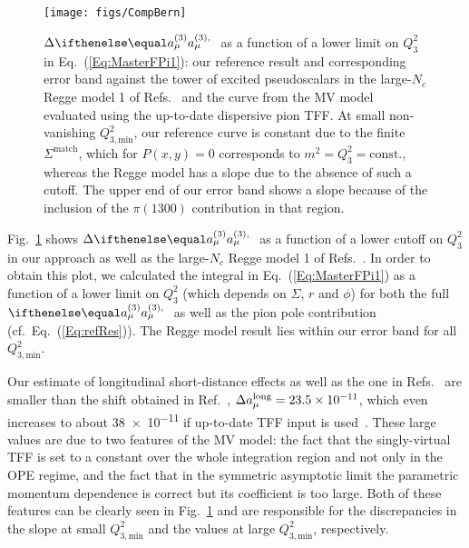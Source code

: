 \begin{figure*}
    \centering
    \texttt{[image: figs/CompBern]}
    \caption{$\Delta \aPion$ as a function of a lower limit on $Q_3^2$ in Eq.~(\ref{Eq:MasterFPi1}): our reference result and corresponding error band against the tower of excited pseudoscalars in the large-$N_c$ Regge model 1 of Refs.~\cite{BernSDCShort,BernSDCLong} and the curve from the MV model~\cite{MV} evaluated using the up-to-date dispersive pion TFF. At small non-vanishing $Q_{3,\text{min}}^2$, our reference curve is constant due to the finite $\Sigma^\text{match}$, which for $P(x,y)=0$ corresponds to $m^2 = Q_3^2 = \text{const.}$, whereas the Regge model has a slope due to the absence of such a cutoff. The upper end of our error band shows a slope because of the inclusion of the $\pi(1300)$ contribution in that region.}
    \label{Fig:Q32MinPion}
\end{figure*}

Fig.~\ref{Fig:Q32MinPion} shows $\Delta \aPion$ as a function of a lower cutoff on $Q_3^2$ in our approach as well as the large-$N_c$ Regge model 1 of Refs.~\cite{BernSDCShort,BernSDCLong}. In order to obtain this plot, we calculated the integral in Eq.~(\ref{Eq:MasterFPi1}) as a function of a lower limit on $Q_3^2$ (which depends on $\Sigma$, $r$ and $\phi$) for both the full $\aPion$ as well as the pion pole contribution (cf.\ Eq.~(\ref{Eq:refRes})). The Regge model result lies within our error band for all $Q_{3,\text{min}}^2$.

Our estimate of longitudinal short-distance effects as well as the one in Refs.~\cite{BernSDCShort,BernSDCLong} are smaller than the shift obtained in Ref.~\cite{MV}, $\Delta a_\mu^\text{long} = \num{23.5 e-11}$, which even increases to about \num{38e-11} if up-to-date TFF input is used~\cite{BernSDCLong}. These large values are due to two features of the MV model: the fact that the singly-virtual TFF is set to a constant over the whole integration region and not only in the OPE regime, and the fact that in the symmetric asymptotic limit the parametric momentum dependence is correct but its coefficient is too large. Both of these features can be clearly seen in Fig.~\ref{Fig:Q32MinPion} and are responsible for the discrepancies in the slope at small $Q_{3,\text{min}}^2$ and the values at large $Q_{3,\text{min}}^2$, respectively.

